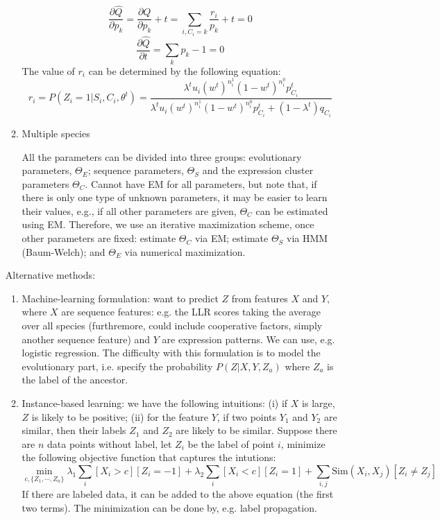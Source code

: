 \documentclass[11pt]{article}
\begin{document}
\begin{enumerate}
\begin{enumerate}
\begin{equation}
\frac{\partial \hat{Q}}{\partial p_k} = \frac{\partial Q}{\partial p_k} + t = \sum_{i, C_i = k}\frac{r_i}{p_k} + t = 0
\end{equation}
\begin{equation}
\frac{\partial \hat{Q}}{\partial t} = \sum_{k}p_k  - 1 = 0
\end{equation}
The value of $r_i$ can be determined by the following equation: 
\begin{equation}
r_i = P(Z_i = 1| S_i, C_i, \theta^t) = \frac{\lambda^t u_i (w^t)^{n_i^1} (1-w^t)^{n_i^0} p_{C_i}^t}{\lambda^t u_i (w^t)^{n_i^1} (1-w^t)^{n_i^0} p_{C_i}^t + (1 - \lambda^t) q_{C_i}}
\end{equation}

\item{Multiple species}

All the parameters can be divided into three groups: evolutionary parameters, $\Theta_E$; sequence parameters, $\Theta_S$ and the expression cluster parameters $\Theta_C$. Cannot have EM for all parameters, but note that, if there is only one type of unknown parameters, it may be easier to learn their values, e.g., if all other parameters are given, $\Theta_C$ can be estimated using EM. Therefore, we use an iterative maximization scheme, once other parameters are fixed: estimate $\Theta_C$ via EM; estimate $\Theta_S$ via HMM (Baum-Welch); and $\Theta_E$ via numerical maximization. 

\end{enumerate}

Alternative methods: 

\begin{enumerate}

\item Machine-learning formulation: want to predict $Z$ from features $X$ and $Y$, where $X$ are sequence features: e.g. the LLR scores taking the average over all species (furthremore, could include cooperative factors, simply another sequence feature) and $Y$ are expression patterns. We can use, e.g. logistic regression. The difficulty with this formulation is to model the evolutionary part, i.e. specify the probability $P(Z|X,Y,Z_a)$ where $Z_a$ is the label of the ancestor. 

\item Instance-based learning: we have the following intuitions: (i) if $X$ is large, $Z$ is likely to be positive; (ii) for the feature $Y$, if two points $Y_1$ and $Y_2$ are similar, then their labels $Z_1$ and $Z_2$ are likely to be similar. Suppose there are $n$ data points without label, let $Z_i$ be the label of point $i$, minimize the following objective function that captures the intutions: 
\begin{equation}
\min_{c, \{Z_1, \cdots, Z_n\}} \lambda_1 \sum_i [X_i > c][Z_i = -1] + \lambda_2 \sum_i[X_i < c][Z_i = 1] + \sum_{i,j} \text{Sim}(X_i, X_j) [ Z_i \neq Z_j]
\end{equation}
If there are labeled data, it can be added to the above equation (the first two terms). The minimization can be done by, e.g. label propagation. 


\end{enumerate}
\end{enumerate}
\end{document}
